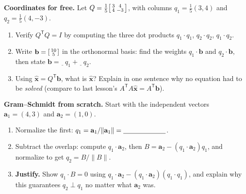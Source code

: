 \documentclass[10pt]{article}
\newcommand{\xx}{\mathbf{x}}
\newcommand{\bb}{\mathbf{b}}
\newcommand{\avec}{\mathbf{a}}
\newcommand{\T}{\mathsf{T}}
\begin{document}
\begin{tcolorbox}[colback=white, colframe=black!40, title=\textbf{Tier A --- Approaching Proficiency},
    fonttitle=\bfseries, arc=1.5mm, left=3mm, right=3mm, top=2mm, bottom=2mm, breakable]
\textbf{Coordinates for free.} Let $Q=\tfrac15\begin{bsmallmatrix} 3 & 4\\ 4 & -3 \end{bsmallmatrix}$, with
columns $q_1=\tfrac15(3,4)$ and $q_2=\tfrac15(4,-3)$.
\begin{enumerate}[leftmargin=1.7em, itemsep=9pt]
  \item Verify $Q^{\T}Q=I$ by computing the three dot products $q_1\!\cdot\!q_1$, $q_2\!\cdot\!q_2$,
        $q_1\!\cdot\!q_2$. 
  \item Write $\bb=\begin{bsmallmatrix} 10\\ 5 \end{bsmallmatrix}$ in the orthonormal basis: find the weights
        $q_1\!\cdot\!\bb$ and $q_2\!\cdot\!\bb$, then state $\bb=\underline{\ \ }\,q_1+\underline{\ \ }\,q_2$.
  \item Using $\hat{\xx}=Q^{\T}\bb$, what is $\hat{\xx}$? Explain in one sentence why no equation had to be
        \emph{solved} (compare to last lesson's $A^{\T}A\hat{\xx}=A^{\T}\bb$). 
\end{enumerate}
\end{tcolorbox}

\begin{tcolorbox}[colback=white, colframe=black!40, title=\textbf{Tier E --- Extension},
    fonttitle=\bfseries, arc=1.5mm, left=3mm, right=3mm, top=2mm, bottom=2mm, breakable]
\textbf{Gram--Schmidt from scratch.} Start with the independent vectors $\avec_1=(4,3)$ and $\avec_2=(1,0)$.
\begin{enumerate}[leftmargin=1.7em, itemsep=9pt]
  \item Normalize the first: $q_1=\avec_1/\|\avec_1\|=\blank{2.2cm}$. \writeline
  \item Subtract the overlap: compute $q_1\!\cdot\!\avec_2$, then $B=\avec_2-(q_1\!\cdot\!\avec_2)q_1$, and
        normalize to get $q_2=B/\|B\|$. 
  \item \textbf{Justify.} Show $q_1\!\cdot\!B=0$ using $q_1\!\cdot\!\avec_2-(q_1\!\cdot\!\avec_2)(q_1\!\cdot\!q_1)$,
        and explain why this guarantees $q_2\perp q_1$ no matter what $\avec_2$ was. 
\end{enumerate}
\end{tcolorbox}
\end{document}
